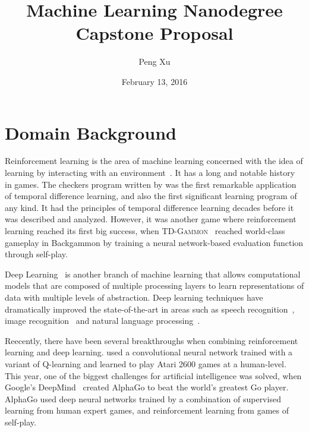 \documentclass{article}
\title{Machine Learning Nanodegree \\ Capstone Proposal}
\author{Peng Xu}
\date{February 13, 2016}
\begin{document}
\maketitle

\section{Domain Background}

Reinforcement learning is the area of machine learning concerned with the idea of learning by
interacting with an environment~\citep{Sutton1998RL}. It has a long and notable history in games.
The checkers program written by \citet{Samuel1959Checkers} was the first remarkable application of
temporal difference learning, and also the first significant learning program of any kind. It had
the principles of temporal difference learning decades before it was described and analyzed.
However, it was another game where reinforcement learning reached its first big success, when
\textsc{TD-Gammon}~\citep{Tesauro1995TD} reached world-class gameplay in Backgammon by training a
neural network-based evaluation function through self-play.

Deep Learning~\citep{LeCun2015Nature} is another branch of machine learning that allows
computational models that are composed of multiple processing layers to learn representations of
data with multiple levels of abstraction.  Deep learning techniques have dramatically improved the
state-of-the-art in areas such as speech recognition~\citep{Hinton2012Speech}, image
recognition~\citep{Krizhevsky2012ImageNet} and natural language processing~\citep{Colbert2012}.

Reecently, there have been several breakthroughs when combining reinforcement learning and deep
learning. \cite{Mnih2015AtariNature} used a convolutional neural network trained with a variant of
Q-learning and learned to play Atari 2600 games at a human-level. This year, one of the biggest
challenges for artificial intelligence was solved, when Google's DeepMind~\citep{Silver2016GoNature}
created AlphaGo to beat the world's greatest Go player. AlphaGo used deep neural networks trained by
a combination of supervised learning from human expert games, and reinforcement learning from games
of self-play.
\end{document}

